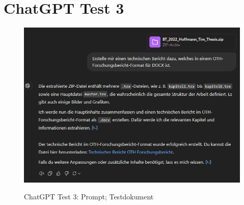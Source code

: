 \section{ChatGPT Test 3}

\begin{figure}[H]
\centering
\includegraphics[width=1\linewidth]{Images/ZIPzuDOCX.png}\\
\caption{Chat\ac{GPT} Test 3: Prompt; Testdokument \cite{hoffmann_tim_2022bt}}
\label{fig:latexzudocxgpt}
\end{figure}

